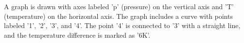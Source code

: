 A graph is drawn with axes labeled 'p' (pressure) on the vertical axis and 'T' (temperature) on the horizontal axis. The graph includes a curve with points labeled '1', '2', '3', and '4'. The point '4' is connected to '3' with a straight line, and the temperature difference is marked as '6K'.